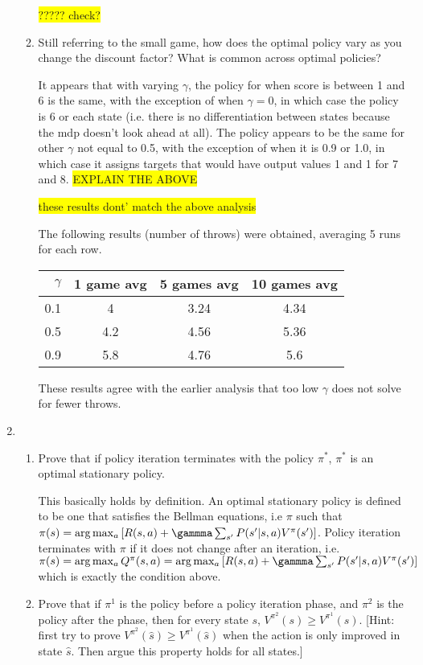 \documentclass{article}
\newcommand{\edit}[1]{\colorbox{Yellow}{#1}}
\begin{document}
\begin{enumerate}
\begin{enumerate}
  \edit{????? check?}

  \item {Still referring to the small game, how does the optimal
  policy vary as you change the discount factor? What is common
  across optimal policies?}

  It appears that with varying $\gamma$, the policy for when score 
  is between 1 and 6 is the same, with the exception of when $\gamma=0$,
  in which case the policy is 6 or each state (i.e. there is no differentiation
  between states because the mdp doesn't look ahead at all). The policy
  appears to be the same for other $\gamma$ not equal to 0.5, with the
  exception of when it is 0.9 or 1.0, in which case it assigns targets
  that would have output values 1 and 1 for 7 and 8. 
  \edit{EXPLAIN THE ABOVE}

  \edit{these results dont' match the above analysis}

  The following results (number of throws) were obtained, averaging 5 runs for each row.
  \begin{tabular}{r|c c c}
  $\gamma$ & 1 game avg & 5 games avg & 10 games avg \\
  \hline
  0.1 & 4 & 3.24 & 4.34 \\
  0.5 & 4.2 & 4.56 & 5.36 \\
  0.9 & 5.8 & 4.76 & 5.6 \\
  \end{tabular}
  These results agree with the earlier analysis that too low $\gamma$
  does not solve for fewer throws. 

  \end{enumerate}

\item 
  \begin{enumerate}
  \item {Prove that if policy iteration terminates with the policy
  $\pi^*$, $\pi^*$ is an optimal stationary policy.}

  This basically holds by definition. An optimal stationary policy is
  defined to be one that satisfies the Bellman equations, i.e $\pi$ such that
  $\pi(s)=\arg\max_{a} \left[R(s,a)+\gammma \sum_{s'} P(s'|s,a)V^{\pi}(s')\right]$.
  Policy iteration terminates with $\pi$ if it does not change after an
  iteration, i.e. 
  $\pi(s)=\arg\max_a Q^\pi (s,a)=\arg\max_a \left[R(s,a)+\gammma \sum_{s'} P(s'|s,a)V^{\pi}(s')\right]$ 
  which is exactly the condition above.   


  \item {Prove that if $\pi^1$ is the policy before a policy iteration
  phase, and $\pi^2$ is the policy after the phase, then for every state $s$,
  $V^{\pi^2}(s)\geq V^{\pi^1}(s)$. [Hint: first try to prove $V^{\pi^2}(\hat s)\geq V^{\pi^1}(\hat s)$
  when the action is only improved in state $\hat s$. Then argue this property
  holds for all states.]}


\end{enumerate}
\end{enumerate}
\end{document}
